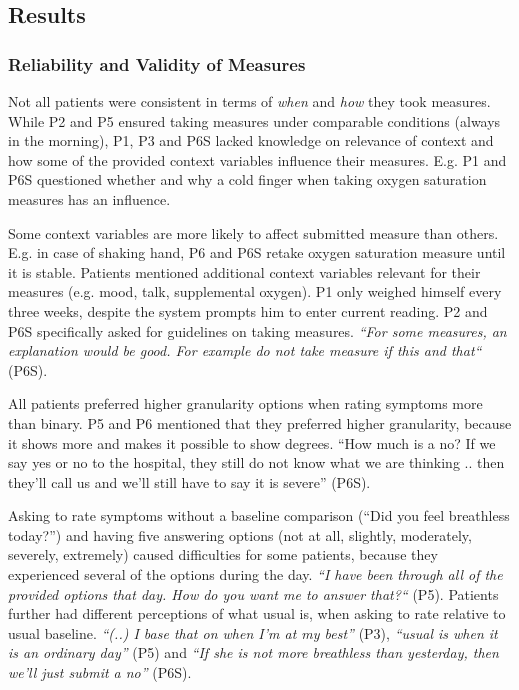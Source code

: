 \subsection{Results}     

\subsubsection{Reliability and Validity of Measures}
Not all patients were consistent in terms of \textit{when} and \textit{how} they took measures. While P2 and P5 ensured taking measures under comparable conditions (always in the morning), P1, P3 and P6S lacked knowledge on relevance of context and how some of the provided context variables influence their measures. E.g. P1 and P6S questioned whether and why a cold finger when taking oxygen saturation measures has an influence. 

Some context variables are more likely to affect submitted measure than others. E.g. in case of shaking hand, P6 and P6S retake oxygen saturation measure until it is stable. Patients mentioned additional context variables relevant for their measures (e.g. mood, talk, supplemental oxygen). P1 only weighed himself every three weeks, despite the system prompts him to enter current reading. P2 and P6S specifically asked for guidelines on taking measures. \textit{“For some measures, an explanation would be good. For example do not take measure if this and that“} (P6S). 

All patients preferred higher granularity options when rating symptoms more than binary. P5 and P6 mentioned that they preferred higher granularity, because it shows more and makes it possible to show degrees. “How much is a no? If we say yes or no to the hospital, they still do not know what we are thinking .. then they’ll call us and we’ll still have to say it is severe” (P6S). 

Asking to rate symptoms without a baseline comparison (“Did you feel breathless today?”) and having five answering options (not at all, slightly, moderately, severely, extremely) caused difficulties for some patients, because they experienced several of the options during the day. \textit{“I have been through all of the provided options that day. How do you want me to answer that?“} (P5). Patients further had different perceptions of what usual is, when asking to rate relative to usual baseline. \textit{“(..) I base that on when I’m at my best”} (P3), \textit{“usual is when it is an ordinary day”} (P5) and \textit{“If she is not more breathless than yesterday, then we’ll just submit a no”} (P6S). 


